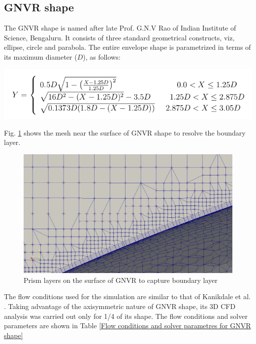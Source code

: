 \subsection{GNVR shape \cite{Ram}}
The GNVR shape \cite{Ram} is named after late Prof. G.N.V Rao of Indian Institute of Science, Bengaluru. It consists of three standard geometrical constructs, viz, ellipse, circle and parabola. The entire envelope shape is parametrized in terms of its maximum diameter ($D$), as follows:
\begin{center}
	\includegraphics[width= 200 pt]{rnd/GNVR_equations.png}
\end{center}
Fig. \ref{prismlayers} shows the mesh near the surface of GNVR shape to resolve the boundary layer.
\begin{figure}[H]
	\centering
	\includegraphics[width=300 pt]{rnd/prism_layer.png}
	\caption{Prism layers on the surface of GNVR to capture boundary layer}
	\label{prismlayers} %
\end{figure}


The flow conditions used for the simulation are similar to that of Kanikdale et al. \cite{Kanikdale}. Taking advantage of the axisymmetric nature of GNVR shape, its 3D CFD analysis was carried out only for 1/4 of its shape. The flow conditions and solver parameters are shown in Table \ref{Flow conditions and solver parametres for GNVR shape}

